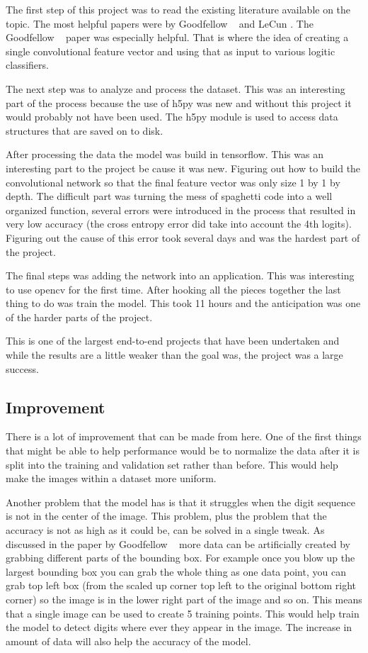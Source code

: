 \documentclass[12pt,twocolumn,letterpaper]{article}
\begin{document}
The first step of this project was to read the existing literature available on 
the topic. The most helpful papers were by Goodfellow \etal ~\cite{goodfellow} and 
LeCun \etal 
\cite{sermanet-icpr-12}. The Goodfellow \etal ~\cite{goodfellow} paper was especially helpful. That 
is where the idea of creating a single convolutional feature vector and using 
that as input to various logitic classifiers.

The next step was to analyze and process the dataset. This was an interesting part 
of the process because the use of h5py was new and without this project it would
probably not have been used. The h5py module is used to access data structures 
that are saved on to disk.

After processing the data the model was build in tensorflow. This was an 
interesting part to the project be cause it was new. Figuring out how to build 
the convolutional network so that the final feature vector was only size 1 by 1 
by depth. The difficult part was turning the mess of spaghetti code into a well 
organized function, several errors were introduced in the process that resulted 
in very low accuracy (the cross entropy error did take into account the 4th 
logits). Figuring out the cause of this error took several days and was the 
hardest part of the project.

The final steps was adding the network into an application. This was interesting 
to use opencv for the first time. After hooking all the pieces together the last
thing to do was train the model. This took 11 hours and the anticipation was one 
of the harder parts of the project.

This is one of the largest end-to-end projects that have been undertaken and while 
the results are a little weaker than the goal was, the project was a large success.
\subsection{Improvement}
There is a lot of improvement that can be made from here. One of the first things 
that might be able to help performance would be to normalize the data after it 
is split into the training and validation set rather than before. This would help 
make the images within a dataset more uniform.

Another problem that the model has is that it struggles when the digit sequence 
is not in the center of the image. This problem, plus the problem that the 
accuracy is not as high as it could be, can be solved in a single tweak. As 
discussed in the paper by Goodfellow \etal ~\cite{goodfellow} more data can be artificially created 
by grabbing different parts of the bounding box. For example once you blow up the
largest bounding box you can grab the whole thing as one data point, you can grab 
top left box (from the scaled up corner top left to the original bottom right 
corner) so the image is in the lower right part of the image and so on. This means that a single
image can be used to create 5 training points. This would help train the model to 
detect digits where ever they appear in the image. The increase in amount of data 
will also help the accuracy of the model. 
\end{document}
